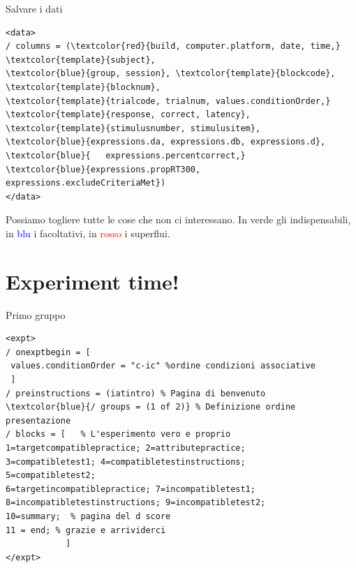 \documentclass{beamer}
\begin{document}
\begin{frame}[fragile]{Salvare i dati }
	\begin{small}
		\begin{Verbatim}[commandchars=\\\{\}]
<data>
/ columns = (\textcolor{red}{build, computer.platform, date, time,} \textcolor{template}{subject}, 
\textcolor{blue}{group, session}, \textcolor{template}{blockcode}, \textcolor{template}{blocknum}, 
\textcolor{template}{trialcode, trialnum, values.conditionOrder,}
\textcolor{template}{response, correct, latency}, 
\textcolor{template}{stimulusnumber, stimulusitem}, 
\textcolor{blue}{expressions.da, expressions.db, expressions.d}, 
\textcolor{blue}{	expressions.percentcorrect,} 
\textcolor{blue}{expressions.propRT300, expressions.excludeCriteriaMet})
</data>			
		\end{Verbatim}
	\end{small}
Possiamo togliere tutte le cose che non ci interessano. In \textcolor{template}{verde} gli indispensabili, in \textcolor{blue}{blu} i facoltativi, in \textcolor{red}{rosso} i superflui.
\end{frame}




\section{Experiment time!}


\begin{frame}[fragile]{Primo gruppo}
	\begin{footnotesize}
			\begin{Verbatim}[commandchars=\\\{\}]
<expt>
/ onexptbegin = [
 values.conditionOrder = "c-ic" %ordine condizioni associative
 ]
/ preinstructions = (iatintro) % Pagina di benvenuto
\textcolor{blue}{/ groups = (1 of 2)} % Definizione ordine presentazione
/ blocks = [   % L'esperimento vero e proprio
1=targetcompatiblepractice; 2=attributepractice; 
3=compatibletest1; 4=compatibletestinstructions;	
5=compatibletest2; 
6=targetincompatiblepractice; 7=incompatibletest1; 
8=incompatibletestinstructions; 9=incompatibletest2; 
10=summary;  % pagina del d score
11 = end; % grazie e arrividerci
			]
</expt>
		\end{Verbatim}
	\end{footnotesize}
\end{frame}
\end{document}
